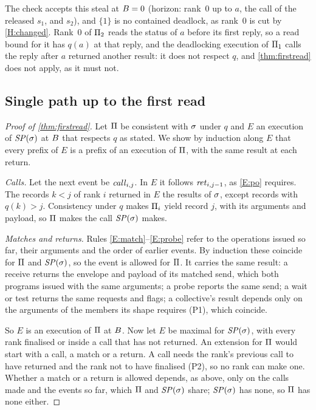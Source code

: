 The \Lone check accepts this steal at $B=0$ (horizon: rank~0 up to $a$, the call of the
released $s_1$, and $s_2$), and $\{1\}$ is no contained deadlock, as rank~0 is cut by
\ref{H:changed}. Rank~0 of $\Pi_2$ reads the status of $a$ before its first reply, so a read
bound for it has $q(a)$ at that reply, and the deadlocking execution of $\Pi_1$ calls the
reply after $a$ returned another result: it does not respect $q$, and \cref{thm:firstread} does
not apply, as it must not.

\subsection{Single path up to the first read}
\label{app:firstread}

\begin{proof}[Proof of \cref{thm:firstread}]
Let $\Pi$ be consistent with $\sigma$ under $q$ and $E$ an execution of $\mathit{SP}(\sigma)$ at
$B$ that respects $q$ as stated. We show by induction along $E$ that every prefix of $E$ is a
prefix of an execution of $\Pi$, with the same result at each return.

\emph{Calls.} Let the next event be $\mathit{call}_{i,j}$. In $E$ it follows $\mathit{ret}_{i,j-1}$, as
\ref{E:po} requires. The records $k<j$ of rank $i$ returned in $E$ the results of $\sigma$,
except records with $q(k)>j$. Consistency under $q$ makes $\Pi_i$ yield record $j$, with its
arguments and payload, so $\Pi$ makes the call $\mathit{SP}(\sigma)$ makes.

\emph{Matches and returns.} Rules \ref{E:match}--\ref{E:probe} refer to the operations issued
so far, their arguments and the order of earlier events. By induction these coincide for
$\Pi$ and $\mathit{SP}(\sigma)$, so the event is allowed for $\Pi$. It carries the same result: a
receive returns the envelope and payload of its matched send, which both programs issued with
the same arguments; a probe reports the same send; a wait or test returns the same requests and
flags; a collective's result depends only on the arguments of the members its shape requires
(P1), which coincide.

So $E$ is an execution of $\Pi$ at $B$. Now let $E$ be maximal for $\mathit{SP}(\sigma)$, with
every rank finalised or inside a call that has not returned. An extension for $\Pi$ would
start with a call, a match or a return. A call needs the rank's previous call to have returned
and the rank not to have finalised (P2), so no rank can make one. Whether a match or a return
is allowed depends, as above, only on the calls made and the events so far, which $\Pi$ and
$\mathit{SP}(\sigma)$ share; $\mathit{SP}(\sigma)$ has none, so $\Pi$ has none either.
\end{proof}


